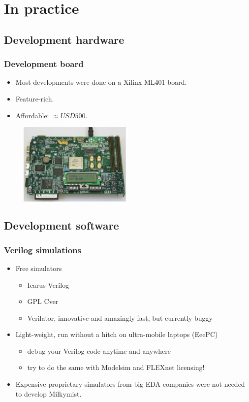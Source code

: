 \documentclass{beamer}
\begin{document}
\section{In practice}
\frame
{
  \begin{center}
  \end{center}
}

\subsection{Development hardware}
\frame
{
  \frametitle{Development board}
  \begin{itemize}
  \item Most developments were done on a Xilinx ML401 board.
  \item Feature-rich.
  \item Affordable: $\approx USD 500$.
  \end{itemize}
  \begin{figure}[H]
  \includegraphics[height=40mm]{ml401.eps}
  \end{figure}
}


\subsection{Development software}
\frame
{
  \frametitle{Verilog simulations}
  \begin{itemize}
  \item Free simulators
  \begin{itemize}
  \item Icarus Verilog
  \item GPL Cver
  \item Verilator, innovative and amazingly fast, but currently buggy
  \end{itemize}
  \item Light-weight, run without a hitch on ultra-mobile laptops (EeePC)
  \begin{itemize}
  \item debug your Verilog code anytime and anywhere
  \item try to do the same with Modelsim and FLEXnet licensing!
  \end{itemize}
  \item Expensive proprietary simulators from big EDA companies were not needed to develop Milkymist.
  \end{itemize}
}
\end{document}
